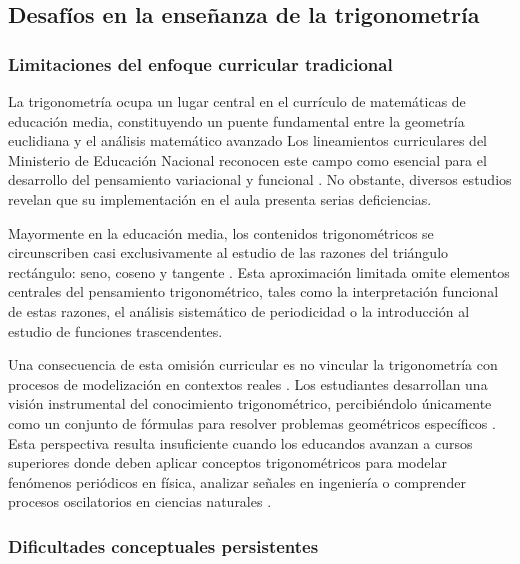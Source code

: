 \subsection{Desafíos en la enseñanza de la trigonometría}

\subsubsection{Limitaciones del enfoque curricular tradicional}

La trigonometría ocupa un lugar central en el currículo de matemáticas de educación media, constituyendo un puente fundamental entre la geometría euclidiana y el análisis matemático avanzado \parencite{weberConnectingResearchTeaching2008} Los lineamientos curriculares del Ministerio de Educación Nacional reconocen este campo como esencial para el desarrollo del pensamiento variacional y funcional \parencite{ministeriodeeducacionnacionalSerieLineamientosCurriculares1988}. No obstante, diversos estudios revelan que su implementación en el aula presenta serias deficiencias.

 Mayormente en la educación media, los contenidos trigonométricos se circunscriben casi exclusivamente al estudio de las razones del triángulo rectángulo: seno, coseno y tangente \parencite{fiallolealAcercaInvestigacionEducacion2015}. Esta aproximación limitada omite elementos centrales del pensamiento trigonométrico, tales como la interpretación funcional de estas razones, el análisis sistemático de periodicidad o la introducción al estudio de funciones trascendentes.

Una consecuencia de esta omisión curricular es no  vincular la trigonometría con procesos de modelización en contextos reales \parencite{rosaEnsenanzaAprendizajeTrigonometria2023}. Los estudiantes desarrollan una visión instrumental del conocimiento trigonométrico, percibiéndolo únicamente como un conjunto de fórmulas para resolver problemas geométricos específicos \parencite{delgadoEstrategiaDidacticaPara2023}. Esta perspectiva resulta insuficiente cuando los educandos avanzan a cursos superiores donde deben aplicar conceptos trigonométricos para modelar fenómenos periódicos en física, analizar señales en ingeniería o comprender procesos oscilatorios en ciencias naturales \parencite{orhaniAddressingStudentsChallenges2024}.

\subsubsection{Dificultades conceptuales persistentes}

